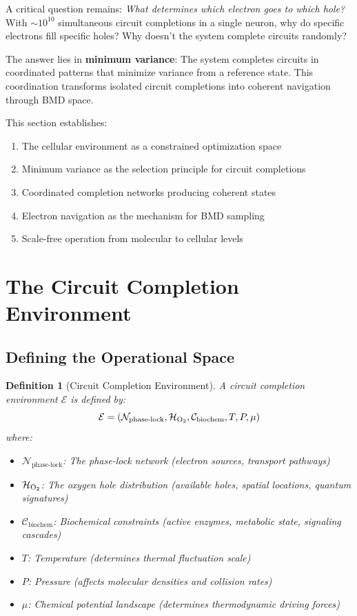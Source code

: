 \documentclass[12pt,a4paper]{article}
\newtheorem{definition}{Definition}
\begin{document}
A critical question remains: \textit{What determines which electron goes to which hole?} With $\sim 10^{10}$ simultaneous circuit completions in a single neuron, why do specific electrons fill specific holes? Why doesn't the system complete circuits randomly?

The answer lies in \textbf{minimum variance}: The system completes circuits in coordinated patterns that minimize variance from a reference state. This coordination transforms isolated circuit completions into coherent navigation through BMD space.

This section establishes:
\begin{enumerate}
\item The cellular environment as a constrained optimization space
\item Minimum variance as the selection principle for circuit completions
\item Coordinated completion networks producing coherent states
\item Electron navigation as the mechanism for BMD sampling
\item Scale-free operation from molecular to cellular levels
\end{enumerate}

\section{The Circuit Completion Environment}

\subsection{Defining the Operational Space}

\begin{definition}[Circuit Completion Environment]
\label{def:completion_environment}
A circuit completion environment $\mathcal{E}$ is defined by:
\begin{equation}
\mathcal{E} = (\mathcal{N}_{\text{phase-lock}}, \mathcal{H}_{\ce{O2}}, \mathcal{C}_{\text{biochem}}, T, P, \mu)
\end{equation}
where:
\begin{itemize}
\item $\mathcal{N}_{\text{phase-lock}}$: The phase-lock network (electron sources, transport pathways)
\item $\mathcal{H}_{\ce{O2}}$: The oxygen hole distribution (available holes, spatial locations, quantum signatures)
\item $\mathcal{C}_{\text{biochem}}$: Biochemical constraints (active enzymes, metabolic state, signaling cascades)
\item $T$: Temperature (determines thermal fluctuation scale)
\item $P$: Pressure (affects molecular densities and collision rates)
\item $\mu$: Chemical potential landscape (determines thermodynamic driving forces)
\end{itemize}
\end{definition}
\end{document}
